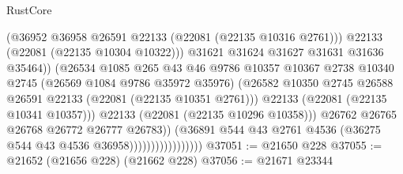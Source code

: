 \begin{lexlean}{RustCore}
\begin{coremodule}
                                              (@36952
                                                @36958
                                                @26591
                                                @22133
                                                (@22081 (@22135 @10316 @2761)))
                                              @22133
                                              (@22081 (@22135 @10304 @10322)))
                                            @31621
                                            @31624
                                            @31627
                                            @31631
                                            @31636
                                            @35464))
                                        (@26534
                                          @1085
                                          @265
                                          @43
                                          @46
                                          @9786
                                          @10357
                                          @10367
                                          @2738
                                          @10340
                                          @2745
                                          (@26569 @1084 @9786 @35972 @35976)
                                          (@26582
                                            @10350
                                            @2745
                                            @26588
                                            @26591
                                            @22133
                                            (@22081 (@22135 @10351 @2761)))
                                          @22133
                                          (@22081 (@22135 @10341 @10357)))
                                        @22133
                                        (@22081 (@22135 @10296 @10358)))
                                      @26762
                                      @26765
                                      @26768
                                      @26772
                                      @26777
                                      @26783))
                                  (@36891
                                    @544
                                    @43
                                    @2761
                                    @4536
                                    (@36275 @544 @43 @4536 @36958)))))))))))))))))
@37051 := @21650 @228
@37055 := @21652 (@21656 @228) (@21662 @228)
@37056 := @21671 @23344

\end{coremodule}
\end{lexlean}
